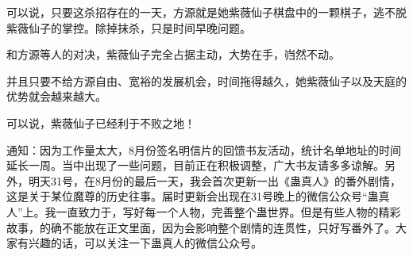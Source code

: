 \begin{this_body}
可以说，只要这杀招存在的一天，方源就是她紫薇仙子棋盘中的一颗棋子，逃不脱紫薇仙子的掌控。除掉抹杀，只是时间早晚问题。

和方源等人的对决，紫薇仙子完全占据主动，大势在手，岿然不动。

并且只要不给方源自由、宽裕的发展机会，时间拖得越久，她紫薇仙子以及天庭的优势就会越来越大。

可以说，紫薇仙子已经利于不败之地！

通知：因为工作量太大，8月份签名明信片的回馈书友活动，统计名单地址的时间延长一周。当中出现了一些问题，目前正在积极调整，广大书友请多多谅解。另外，明天31号，在8月份的最后一天，我会首次更新一出《蛊真人》的番外剧情，这是关于某位魔尊的历史往事。届时更新会出现在31号晚上的微信公众号“蛊真人”上。我一直致力于，写好每一个人物，完善整个蛊世界。但是有些人物的精彩故事，的确不能放在正文里面，因为会影响整个剧情的连贯性，只好写番外了。大家有兴趣的话，可以关注一下蛊真人的微信公众号。

\end{this_body}

